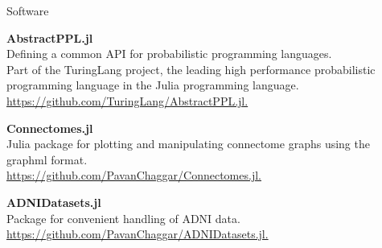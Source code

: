 \begin{rSection}{Software}

{\bf AbstractPPL.jl} \\
Defining a common API for probabilistic programming languages. \\
Part of the TuringLang project, the leading high performance probabilistic programming language
in the Julia programming language.
\href{https://github.com/TuringLang/AbstractPPL.jl}{https://github.com/TuringLang/AbstractPPL.jl.}

{\bf Connectomes.jl} \\
Julia package for plotting and manipulating connectome graphs using the graphml format. \\
\href{https://github.com/PavanChaggar/Connectomes.jl}{https://github.com/PavanChaggar/Connectomes.jl.}

{\bf ADNIDatasets.jl} \\
Package for convenient handling of ADNI data. \\
\href{https://github.com/PavanChaggar/ADNIDatasets.jl}{https://github.com/PavanChaggar/ADNIDatasets.jl.}
\end{rSection}